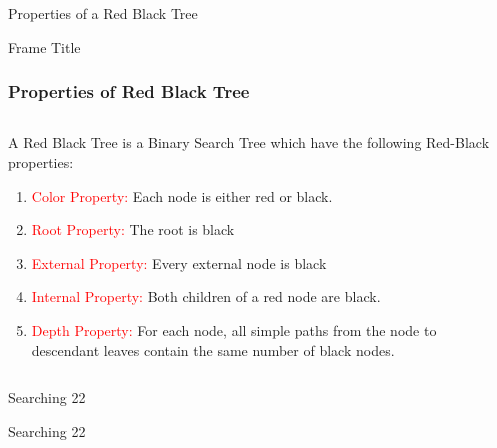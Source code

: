 \documentclass{beamer}
\begin{document}
\begin{frame}{Properties of a Red Black Tree}
\centering

\end{frame}

\begin{frame}{Frame Title}
\frametitle{Properties of Red Black Tree}
    \begin{columns}
        \begin{column}{0.5\textwidth}
            A Red Black Tree is a Binary Search Tree which have the following Red-Black properties: 

            \begin{enumerate}
                
                \item \textcolor{red}{Color Property:} Each node is either red or black.
                \item \textcolor{red}{Root Property:} The root is black
                \item \textcolor{red}{External Property:} Every external node is black
                \item \textcolor{red}{Internal Property:} Both children of a red node are black.
                \item \textcolor{red}{Depth Property:} For each node, all simple paths from the node to descendant leaves contain the same number of black nodes.
            \end{enumerate}
            
        \end{column}
        
        \begin{column}{0.5\textwidth}
            \centering
            
        \end{column}
        
        
    \end{columns}


    
\end{frame}



\begin{frame}{Searching 22}
\centering

\end{frame}


\begin{frame}{Searching 22}
\centering

\end{frame}
\end{document}

